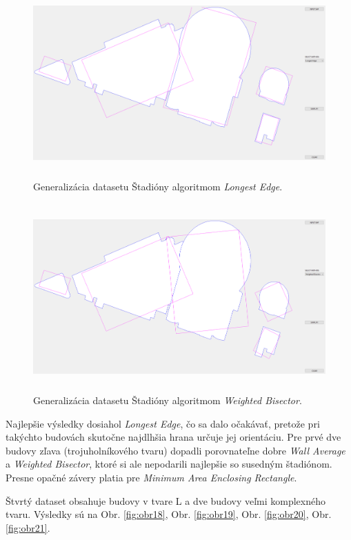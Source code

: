 \documentclass[11pt]{article}
\begin{document}
\begin{figure}[h]
\captionsetup{justification=centering}
\centering
\includegraphics[width=14.65cm, height=7.2cm]{images/stadion_le.png}
\caption{Generalizácia datasetu Štadióny algoritmom \textit{Longest Edge}.}
\label{fig:obr16}
\end{figure}

\begin{figure}[h]
\captionsetup{justification=centering}
\centering
\includegraphics[width=14.65cm, height=7.2cm]{images/stadion_bi.png}
\caption{Generalizácia datasetu Štadióny algoritmom \textit{Weighted Bisector}.}
\label{fig:obr17}
\end{figure}

\noindent Najlepšie výsledky dosiahol \textit{Longest Edge}, čo sa dalo očakávať, pretože pri takýchto budovách skutočne najdlhšia hrana určuje jej orientáciu. Pre prvé dve budovy zľava (trojuholníkového tvaru) dopadli porovnateľne dobre \textit{Wall Average} a \textit{Weighted Bisector}, ktoré si ale nepodarili najlepšie so susedným štadiónom. Presne opačné závery platia pre \textit{Minimum Area Enclosing Rectangle}.

\newpage
Štvrtý dataset obsahuje budovy v tvare L a dve budovy veľmi komplexného tvaru. Výsledky sú na Obr. \ref{fig:obr18}, Obr. \ref{fig:obr19}, Obr. \ref{fig:obr20}, Obr. \ref{fig:obr21}.
\end{document}
